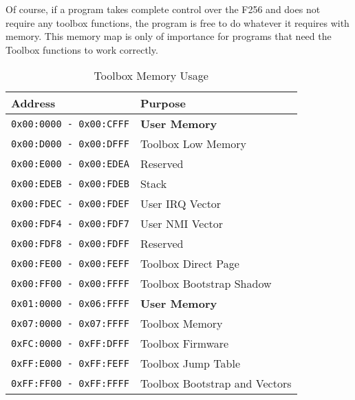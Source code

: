 Of course, if a program takes complete control over the F256 and does not require any toolbox functions, the program is free
to do whatever it requires with memory. This memory map is only of importance for programs that need the Toolbox functions to
work correctly.

\begin{table}
	\begin{center}
		\begin{tabular}{|l|l|} \hline
			Address & Purpose \\ \hline\hline
			{\tt 0x00:0000 - 0x00:CFFF} & {\bf User Memory} \\ \hline
			{\tt 0x00:D000 - 0x00:DFFF} & Toolbox Low Memory \\ \hline
			{\tt 0x00:E000 - 0x00:EDEA} & Reserved \\ \hline
			{\tt 0x00:EDEB - 0x00:FDEB} & Stack \\ \hline
			{\tt 0x00:FDEC - 0x00:FDEF} & User IRQ Vector \\ \hline
			{\tt 0x00:FDF4 - 0x00:FDF7} & User NMI Vector \\ \hline
			{\tt 0x00:FDF8 - 0x00:FDFF} & Reserved \\ \hline
			{\tt 0x00:FE00 - 0x00:FEFF} & Toolbox Direct Page \\ \hline
			{\tt 0x00:FF00 - 0x00:FFFF} & Toolbox Bootstrap Shadow \\ \hline
			{\tt 0x01:0000 - 0x06:FFFF} & {\bf User Memory} \\ \hline	
			{\tt 0x07:0000 - 0x07:FFFF} & Toolbox Memory \\ \hline
			{\tt 0xFC:0000 - 0xFF:DFFF} & Toolbox Firmware \\ \hline
			{\tt 0xFF:E000 - 0xFF:FEFF} & Toolbox Jump Table \\ \hline
			{\tt 0xFF:FF00 - 0xFF:FFFF} & Toolbox Bootstrap and Vectors \\ \hline
		\end{tabular}
	\end{center}
	\caption{Toolbox Memory Usage}
	\label{tbl:memory_map}
\end{table}